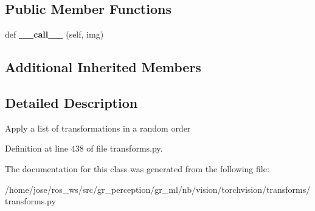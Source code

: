 \subsection*{Public Member Functions}
\begin{DoxyCompactItemize}
\item 
\mbox{\label{classtorchvision_1_1transforms_1_1transforms_1_1RandomOrder_ace6f4766eb4276457f0ced3630476006}} 
def {\bfseries \+\_\+\+\_\+call\+\_\+\+\_\+} (self, img)
\end{DoxyCompactItemize}
\subsection*{Additional Inherited Members}


\subsection{Detailed Description}
\begin{DoxyVerb}Apply a list of transformations in a random order
\end{DoxyVerb}
 

Definition at line 438 of file transforms.\+py.



The documentation for this class was generated from the following file\+:\begin{DoxyCompactItemize}
\item 
/home/jose/ros\+\_\+ws/src/gr\+\_\+perception/gr\+\_\+ml/nb/vision/torchvision/transforms/transforms.\+py\end{DoxyCompactItemize}
